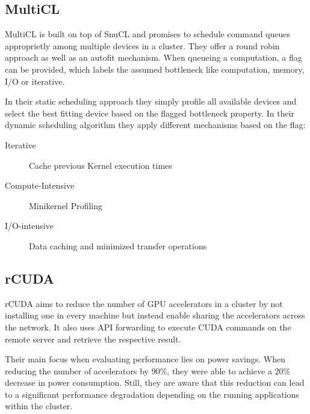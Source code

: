 \subsection{MultiCL\cite{multicl}}

MultiCL is built on top of SnuCL and promises to schedule command queues approprietly among multiple devices in a cluster. They offer a round robin approach as well as an autofit mechanism. When queueing a computation, a flag can be provided, which labels the assumed bottleneck like computation, memory, I/O or iterative.

In their static scheduling approach they simply profile all available devices and select the best fitting device based on the flagged bottleneck property. In their dynamic scheduling algorithm they apply different mechanisms based on the flag:

\begin{description}
\item [Iterative] Cache previous Kernel execution times
\item [Compute-Intensive] Minikernel Profiling
\item [I/O-intensive] Data caching and minimized transfer operations
\end{description}

\subsection{rCUDA\cite{rcuda}}

rCUDA aims to reduce the number of GPU accelerators in a cluster by not installing one in every machine but instead enable sharing the accelerators across the network. It also uses API forwarding to execute CUDA commands on the remote server and retrieve the respective result.

Their main focus when evaluating performance lies on power savings. When reducing the number of accelerators by 90\%, they were able to achieve a 20\% decrease in power consumption. Still, they are aware that this reduction can lead to a significant performance degradation depending on the running applications within the cluster.
